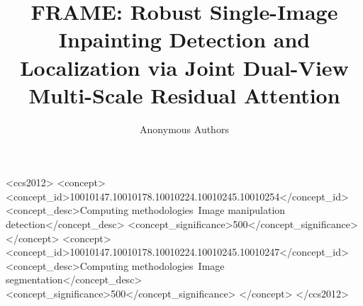 \documentclass[sigconf, review=true]{acmart}
\begin{document}
\title{FRAME: Robust Single-Image Inpainting Detection and Localization via Joint Dual-View Multi-Scale Residual Attention}
\author{Anonymous Authors}
\renewcommand{\shortauthors}{Anonymous et al.}



\begin{CCSXML}
<ccs2012>
   <concept>
       <concept_id>10010147.10010178.10010224.10010245.10010254</concept_id>
       <concept_desc>Computing methodologies~Image manipulation detection</concept_desc>
       <concept_significance>500</concept_significance>
       </concept>
   <concept>
       <concept_id>10010147.10010178.10010224.10010245.10010247</concept_id>
       <concept_desc>Computing methodologies~Image segmentation</concept_desc>
       <concept_significance>500</concept_significance>
       </concept>
 </ccs2012>
\end{CCSXML}



\maketitle





\end{document}
